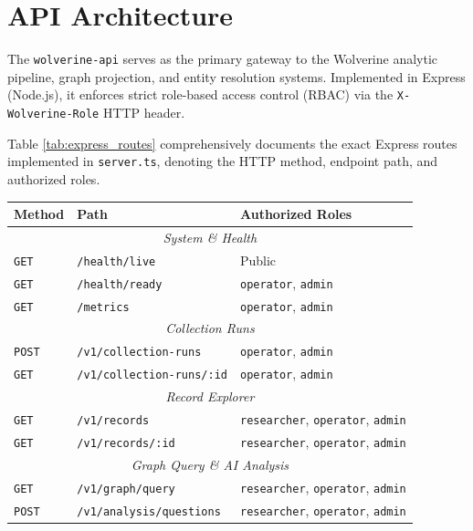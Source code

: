 \chapter{API Architecture}
\label{app:api}

The \texttt{wolverine-api} serves as the primary gateway to the Wolverine analytic pipeline, graph projection, and entity resolution systems. Implemented in Express (Node.js), it enforces strict role-based access control (RBAC) via the \texttt{X-Wolverine-Role} HTTP header. 

Table \ref{tab:express_routes} comprehensively documents the exact Express routes implemented in \texttt{server.ts}, denoting the HTTP method, endpoint path, and authorized roles.

\begin{table}[h!]
    \centering
    \footnotesize
    \begin{tabular}{llp{6cm}}
    \toprule
    \textbf{Method} & \textbf{Path} & \textbf{Authorized Roles} \\
    \midrule
    \multicolumn{3}{c}{\textit{System \& Health}} \\
    \midrule
    \texttt{GET} & \texttt{/health/live} & Public \\
    \texttt{GET} & \texttt{/health/ready} & \texttt{operator}, \texttt{admin} \\
    \texttt{GET} & \texttt{/metrics} & \texttt{operator}, \texttt{admin} \\
    \midrule
    \multicolumn{3}{c}{\textit{Collection Runs}} \\
    \midrule
    \texttt{POST} & \texttt{/v1/collection-runs} & \texttt{operator}, \texttt{admin} \\
    \texttt{GET} & \texttt{/v1/collection-runs/:id} & \texttt{operator}, \texttt{admin} \\
    \midrule
    \multicolumn{3}{c}{\textit{Record Explorer}} \\
    \midrule
    \texttt{GET} & \texttt{/v1/records} & \texttt{researcher}, \texttt{operator}, \texttt{admin} \\
    \texttt{GET} & \texttt{/v1/records/:id} & \texttt{researcher}, \texttt{operator}, \texttt{admin} \\
    \midrule
    \multicolumn{3}{c}{\textit{Graph Query \& AI Analysis}} \\
    \midrule
    \texttt{GET} & \texttt{/v1/graph/query} & \texttt{researcher}, \texttt{operator}, \texttt{admin} \\
    \texttt{POST} & \texttt{/v1/analysis/questions} & \texttt{researcher}, \texttt{operator}, \texttt{admin} \\

\end{tabular}
\end{table}
